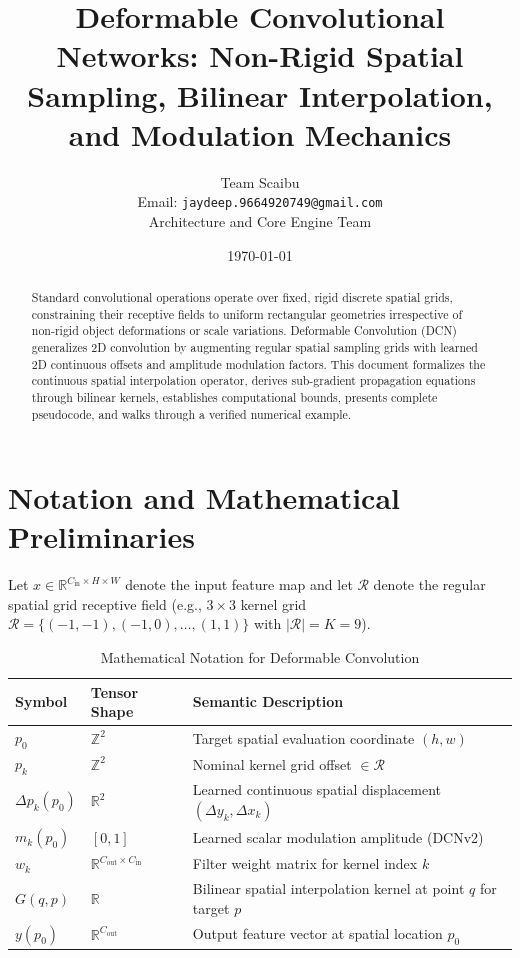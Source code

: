 \documentclass[11pt,a4paper]{article}
\title{Deformable Convolutional Networks: Non-Rigid Spatial Sampling, Bilinear Interpolation, and Modulation Mechanics}
\author{Team Scaibu \\ \small Email: \texttt{jaydeep.9664920749@gmail.com} \\ \small Architecture and Core Engine Team}
\date{\today}
\theoremstyle{definition}
\begin{document}
\maketitle

\begin{abstract}
Standard convolutional operations operate over fixed, rigid discrete spatial grids, constraining their receptive fields to uniform rectangular geometries irrespective of non-rigid object deformations or scale variations. Deformable Convolution (DCN) generalizes 2D convolution by augmenting regular spatial sampling grids with learned 2D continuous offsets and amplitude modulation factors. This document formalizes the continuous spatial interpolation operator, derives sub-gradient propagation equations through bilinear kernels, establishes computational bounds, presents complete pseudocode, and walks through a verified numerical example.
\end{abstract}

\section{Notation and Mathematical Preliminaries}

Let $x \in \mathbb{R}^{C_{\text{in}} \times H \times W}$ denote the input feature map and let $\mathcal{R}$ denote the regular spatial grid receptive field (e.g., $3 \times 3$ kernel grid $\mathcal{R} = \{(-1,-1), (-1,0), \dots, (1,1)\}$ with $|\mathcal{R}| = K = 9$).

\begin{table}[h]
\centering
\caption{Mathematical Notation for Deformable Convolution}
\begin{tabular}{lll}
\toprule
\textbf{Symbol} & \textbf{Tensor Shape} & \textbf{Semantic Description} \\
\midrule
$p_0$ & $\mathbb{Z}^2$ & Target spatial evaluation coordinate $(h, w)$ \\
$p_k$ & $\mathbb{Z}^2$ & Nominal kernel grid offset $\in \mathcal{R}$ \\
$\Delta p_k(p_0)$ & $\mathbb{R}^2$ & Learned continuous spatial displacement $(\Delta y_k, \Delta x_k)$ \\
$m_k(p_0)$ & $[0, 1]$ & Learned scalar modulation amplitude (DCNv2) \\
$w_k$ & $\mathbb{R}^{C_{\text{out}} \times C_{\text{in}}}$ & Filter weight matrix for kernel index $k$ \\
$G(q, p)$ & $\mathbb{R}$ & Bilinear spatial interpolation kernel at point $q$ for target $p$ \\
$y(p_0)$ & $\mathbb{R}^{C_{\text{out}}}$ & Output feature vector at spatial location $p_0$ \\
\bottomrule
\end{tabular}
\end{table}
\end{document}
